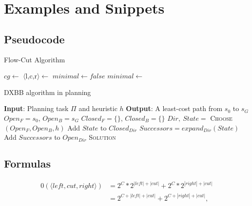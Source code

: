 \chapter{Examples and Snippets}\label{cha:A}

\section{Pseudocode}

\begin{algorithm}
\begin{algorithmic}[1]
\caption{Flow-Cut Algorithm}\label{algo:flowCut}
\State $cg \gets$ 
\State $\langle$l,c,r$\rangle \gets$ 
\State $minimal \gets false$
\State $minimal \gets$ 
\EndWhile
\State \Return {}
\EndProcedure
\end{algorithmic}
\end{algorithm}

\begin{algorithm}
\begin{algorithmic}[1]
\caption{DXBB algorithm in planning}\label{algo:genericSearch}
\Statex \textbf{Input}: Planning task $\Pi$ and heuristic $h$
\Statex \textbf{Output}: A least-cost path from $s_0$ to $s_G$
\State $Open_F = s_0$, $Open_B = s_G$
\State $Closed_F = \{\}$, $Closed_B = \{\}$
\State $Dir,\ State =$ \textsc{Choose}$(Open_F,Open_B,h)$ 
\State Add $State$ to $Closed_{Dir}$
\State $Successors = expand_{Dir}(State)$
\State Add $Successors$ to $Open_{Dir}$
\EndWhile
\State \Return \textsc{Solution}
\end{algorithmic}
\end{algorithm}

\newpage
\section{Formulas}

\begin{equation}
\begin{aligned}
0(\langle left,cut,right\rangle) &= 2^C * 2^{|left|+|cut|} + 2^C * 2^{|right|+|cut|}\\
&= 2^{C+|left|+|cut|} + 2^{C+|right|+|cut|},
\end{aligned}
\end{equation}

